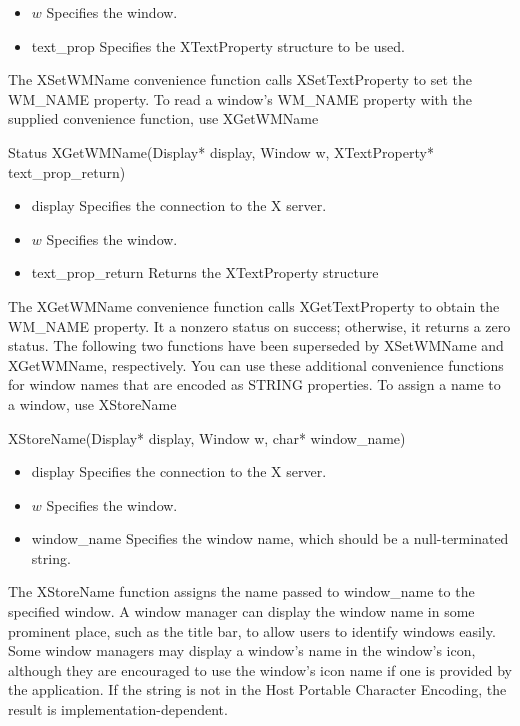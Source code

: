 \documentclass{report}
\begin{document}
\begin{itemize}
\begin{itemize}
\begin{itemize}
                \item $w$ Specifies the window.
                \item text\_prop Specifies the XTextProperty structure to be used.
            \end{itemize}
            The XSetWMName convenience function calls XSetTextProperty to set the WM\_NAME property.
            \bigbreak \noindent 
            To read a window’s WM\_NAME property with the supplied convenience function, use XGetWMName
            \bigbreak \noindent 
            \begin{cppcode}
            Status XGetWMName(Display* display, Window w, XTextProperty* text_prop_return)
            \end{cppcode}
            \begin{itemize}
                \item display Specifies the connection to the X server.
                \item $w$ Specifies the window.
                \item text\_prop\_return Returns the XTextProperty structure
            \end{itemize}
            The XGetWMName convenience function calls XGetTextProperty to obtain the WM\_NAME property. It  a nonzero status on success; otherwise, it returns a zero status.
            \bigbreak \noindent 
            The following two functions have been superseded by XSetWMName and XGetWMName, respectively. You can use these additional convenience functions for window names that are encoded as STRING properties.
            \bigbreak \noindent 
            To assign a name to a window, use XStoreName
            \bigbreak \noindent 
            \begin{cppcode}
            XStoreName(Display* display, Window w, char* window_name)
            \end{cppcode}
            \begin{itemize}
                \item display Specifies the connection to the X server.
                \item $w$ Specifies the window.
                \item window\_name Specifies the window name, which should be a null-terminated string.
            \end{itemize}
            The XStoreName function assigns the name passed to window\_name to the specified window. A window manager can display the window name in some prominent place, such as the title bar, to allow users to identify windows easily. Some window managers may display a window’s name in the window’s icon, although they are encouraged to use the window’s icon name if one is provided by the application. If the string is not in the Host Portable Character Encoding, the result is implementation-dependent.

\end{itemize}
\end{itemize}
\end{document}
